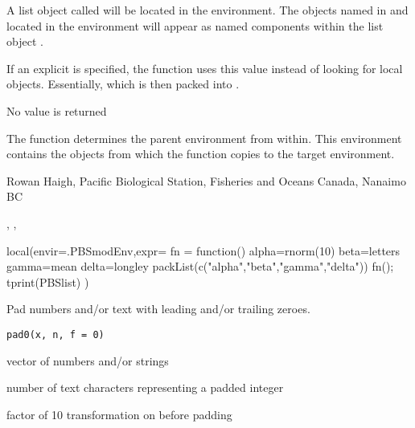\documentclass[letterpaper]{book}
\begin{document}
%
\begin{Details}\relax
A list object called  will be located in the 
 environment. The objects named in  and 
located in the  environment will appear as named 
components within the list object .

If an explicit  is specified, the function uses this value
instead of looking for local objects. Essentially, 
which is then packed into .
\end{Details}
%
\begin{Value}
No value is returned
\end{Value}
%
\begin{Note}\relax
The function determines the parent environment from within. 
This environment contains the objects from which the function copies to the target environment.
\end{Note}
%
\begin{Author}\relax
Rowan Haigh, Pacific Biological Station, Fisheries and Oceans Canada, Nanaimo BC
\end{Author}
%
\begin{SeeAlso}\relax
{}, , 
\end{SeeAlso}
%
\begin{Examples}
\begin{ExampleCode}
local(envir=.PBSmodEnv,expr={
  fn = function() {
    alpha=rnorm(10)
    beta=letters
    gamma=mean
    delta=longley
    packList(c("alpha","beta","gamma","delta")) }
  fn(); tprint(PBSlist)
})
\end{ExampleCode}
\end{Examples}
%
\begin{Description}\relax
Pad numbers and/or text with leading and/or trailing zeroes.
\end{Description}
%
\begin{Usage}
\begin{verbatim}
pad0(x, n, f = 0)
\end{verbatim}
\end{Usage}
%
\begin{Arguments}
\begin{ldescription}
\item[\code{x}] vector of numbers and/or strings
\item[\code{n}] number of text characters representing a padded integer
\item[\code{f}] factor of 10 transformation on  before padding
\end{ldescription}
\end{Arguments}
\end{document}
